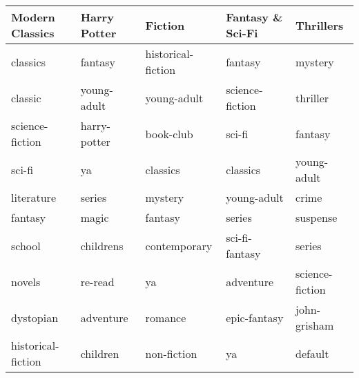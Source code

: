 \begin{tabular}{lllll}
\toprule
    Modern Classics &  Harry Potter &             Fiction & Fantasy \& Sci-Fi &        Thrillers \\
\midrule
           classics &       fantasy &  historical-fiction &          fantasy &          mystery \\
            classic &   young-adult &         young-adult &  science-fiction &         thriller \\
    science-fiction &  harry-potter &           book-club &           sci-fi &          fantasy \\
             sci-fi &            ya &            classics &         classics &      young-adult \\
         literature &        series &             mystery &      young-adult &            crime \\
            fantasy &         magic &             fantasy &           series &         suspense \\
             school &     childrens &        contemporary &   sci-fi-fantasy &           series \\
             novels &       re-read &                  ya &        adventure &  science-fiction \\
          dystopian &     adventure &             romance &     epic-fantasy &     john-grisham \\
 historical-fiction &      children &         non-fiction &               ya &          default \\
\bottomrule
\end{tabular}
